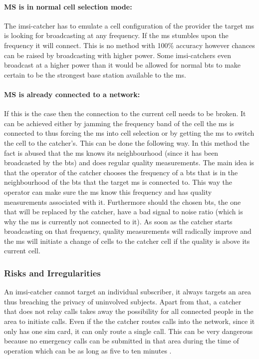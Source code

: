 \paragraph{MS is in normal cell selection mode:}
The \gls{imsi}-catcher has to emulate a cell configuration of the provider the target \gls{ms} is looking for broadcasting at any frequency.
If the \gls{ms} stumbles upon the frequency it will connect.
This is no method with 100\% accuracy however chances can be raised by broadcasting with higher power.
Some \gls{imsi}-catchers even broadcast at a higher power than it would be allowed for normal \gls{bts} \cite{imsi_wiki} to make certain to be the strongest base station available to the \gls{ms}.

\paragraph{MS is already connected to a network:}
If this is the case then the connection to the current cell needs to be broken.
It can be achieved either by jamming the frequency band of the cell the \gls{ms} is connected to thus forcing the \gls{ms} into cell selection or by getting the \gls{ms} to switch the cell to the catcher's.
This can be done the following way.
In this method the fact is abused that the \gls{ms} knows its neighbourhood (since it has been broadcasted by the \gls{bts}) and does regular quality measurements.
The main idea is that the operator of the catcher chooses the frequency of a \gls{bts} that is in the neighbourhood of the \gls{bts} that the target \gls{ms} is connected to.
This way the operator can make sure the \gls{ms} know this frequency and has quality measurements associated with it.
Furthermore should the chosen \gls{bts}, the one that will be replaced by the catcher, have a bad signal to noise ratio (which is why the \gls{ms} is currently not connected to it).
As soon as the catcher starts broadcasting on that frequency, quality measurements will radically improve and the \gls{ms} will initiate a change of cells to the catcher cell if the quality is above its current cell.

\subsubsection{Risks and Irregularities}
An \gls{imsi}-catcher cannot target an individual subscriber, it always targets an area thus breaching the privacy of uninvolved subjects.
Apart from that, a catcher that does not relay calls takes away the possibility for all connected people in the area to initiate calls.
Even if the the catcher routes calls into the network, since it only has one \gls{sim} card, it can only route a single call.
This can be very dangerous because no emergency calls can be submitted in that area during the time of operation which can be as long as five to ten minutes \cite{fox}.


